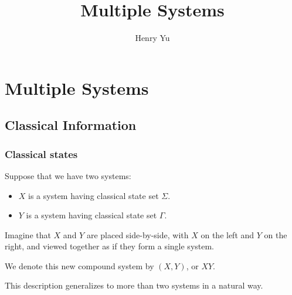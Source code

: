 \documentclass{report}
\title{\Huge{Multiple Systems}}
\author{\huge{Henry Yu}}
\date{}
\begin{document}
\raggedright

\maketitle
\newpage
{}
\tableofcontents
\pagebreak


\chapter{Multiple Systems}
\section{Classical Information}
\subsection{Classical states}
Suppose that we have two systems:
\begin{itemize}
    \item $X$ is a system having classical state set $\Sigma$.
    \item $Y$ is a system having classical state set $\Gamma$.
\end{itemize}
Imagine that $X$ and $Y$ are placed side-by-side, with $X$ on the left and $Y$ on the right, and viewed together as if they form a single system.

\bigbreak

We denote this new compound system by $(X,Y)$, or $XY$.



\raggedright
This description generalizes to more than two systems in a natural way.
\end{document}
